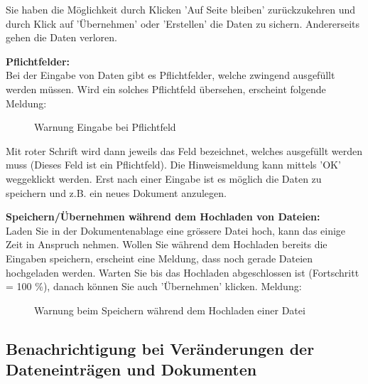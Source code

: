 \vspace{\baselineskip}

Sie haben die Möglichkeit durch Klicken 'Auf Seite bleiben' zurückzukehren und durch Klick auf 'Übernehmen' oder 'Erstellen' die Daten zu sichern. Andererseits gehen die Daten verloren.

\vspace{\baselineskip}

\textbf{Pflichtfelder:}\\
Bei der Eingabe von Daten gibt es Pflichtfelder, welche zwingend ausgefüllt werden müssen. Wird ein solches Pflichtfeld übersehen, erscheint folgende Meldung:

\begin{figure}[H]
\caption{Warnung Eingabe bei Pflichtfeld}
\end{figure}

Mit roter Schrift wird dann jeweils das Feld bezeichnet, welches ausgefüllt werden muss (Dieses Feld ist ein Pflichtfeld). Die Hinweismeldung kann mittels 'OK' weggeklickt werden. Erst nach einer Eingabe ist es möglich die Daten zu speichern und z.B. ein neues Dokument anzulegen. 

\vspace{\baselineskip}

\textbf{Speichern/Übernehmen während dem Hochladen von Dateien:}\\
Laden Sie in der Dokumentenablage eine grössere Datei hoch, kann das einige Zeit in Anspruch nehmen. Wollen Sie während dem Hochladen bereits die Eingaben speichern, erscheint eine Meldung, dass noch gerade Dateien hochgeladen werden. Warten Sie bis das Hochladen abgeschlossen ist (Fortschritt = 100 \%), danach können Sie auch 'Übernehmen' klicken. Meldung:

\begin{figure}[H]
\caption{Warnung beim Speichern während dem Hochladen einer Datei}
\end{figure}

\pagebreak
\subsection{Benachrichtigung bei Veränderungen der Dateneinträgen und Dokumenten}

